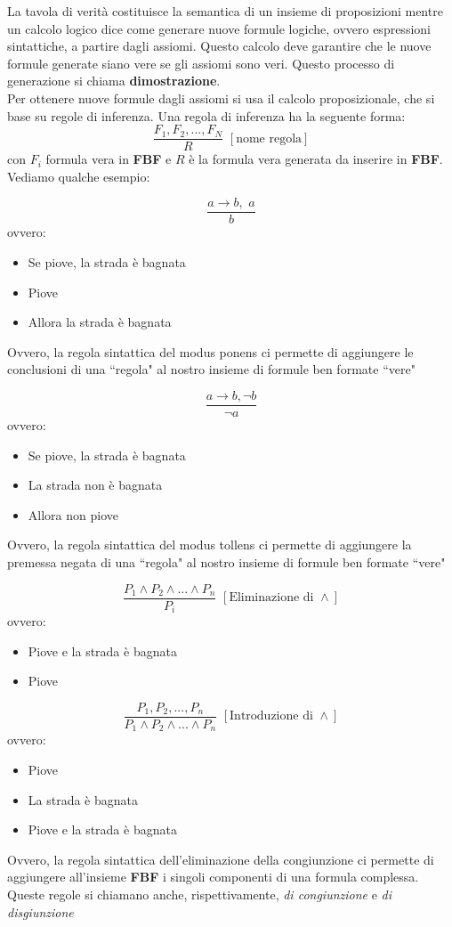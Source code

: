 \documentclass[a4paper,12pt, oneside]{book}
\begin{document}
La tavola di verità costituisce la semantica di un insieme di proposizioni mentre un calcolo logico dice come generare nuove formule logiche, ovvero espressioni sintattiche, a partire dagli assiomi. Questo calcolo deve garantire che le nuove formule generate siano vere se gli assiomi sono veri. Questo processo di generazione si chiama \textbf{dimostrazione}.\\
Per ottenere nuove formule dagli assiomi si usa il calcolo proposizionale, che si base su regole di inferenza. Una regola di inferenza ha la seguente forma:
$$\frac{F_1,F_2,...,F_N}{R}\,\,[\mbox{nome regola}]$$
con $F_i$ formula vera in \textbf{FBF} e $R$ è la formula vera generata da inserire in \textbf{FBF}. Vediamo qualche esempio:
\begin{esempio}
$$\frac{a\to b,\,\,a}{b}$$
ovvero:
\begin{itemize}
\item Se piove, la strada è bagnata
\item Piove
\item Allora la strada è bagnata
\end{itemize}
Ovvero, la regola sintattica del modus ponens ci permette di
aggiungere le conclusioni di una “regola" al nostro insieme di formule ben formate “vere"
\end{esempio}
\begin{esempio}
$$\frac{a\to b, \neg b}{\neg a}$$
ovvero:
\begin{itemize}
\item Se piove, la strada è bagnata
\item La strada non è bagnata
\item Allora non piove
\end{itemize}
Ovvero, la regola sintattica del modus tollens ci permette di
aggiungere la premessa negata di una “regola" al nostro insieme di formule ben formate “vere"
\end{esempio}
\begin{esempio}
$$\frac{P_1\wedge P_2 \wedge ... \wedge P_n}{P_i}\,\,[\mbox{Eliminazione di }\wedge]$$
ovvero:
\begin{itemize}
\item Piove e la strada è bagnata
\item Piove
\end{itemize}
$$\frac{P_1, P_2,...,P_n}{P_1\wedge P_2 \wedge ... \wedge P_n}\,\,[\mbox{Introduzione di }\wedge]$$
ovvero:
\begin{itemize}
\item Piove
\item La strada è bagnata
\item Piove e la strada è bagnata
\end{itemize}
Ovvero, la regola sintattica dell’eliminazione della congiunzione ci permette di aggiungere all’insieme \textbf{FBF} i singoli componenti di una formula complessa. \\
Queste regole si chiamano anche, rispettivamente, \textit{di congiunzione} e \textit{di disgiunzione}
\end{esempio}
\end{document}
